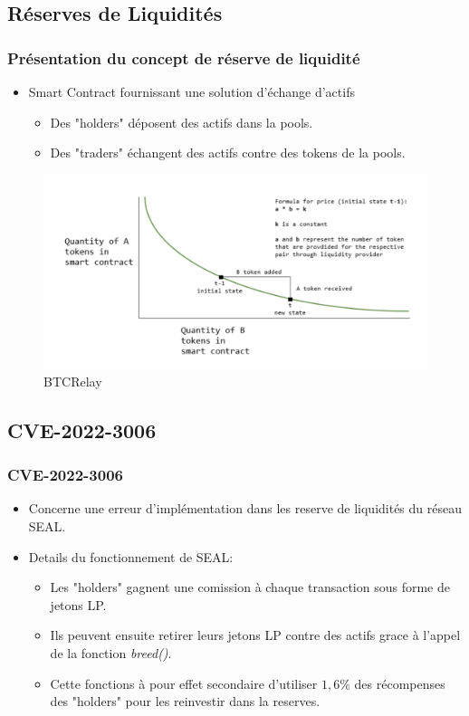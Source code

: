 \subsection{Réserves de Liquidités}

\begin{frame}
    \frametitle{Présentation du concept de réserve de liquidité}
    \begin{itemize}
        \item Smart Contract fournissant une solution d'échange d'actifs
        \begin{itemize}
            \item Des "holders" déposent des actifs dans la pools.
            \item Des "traders" échangent des actifs contre des tokens de la pools.
        \end{itemize}
    \end{itemize}    
    \begin{figure}
        \centering
        \includegraphics[scale = 0.22]{decentralisation/reserve_liquidite.png}
        \caption{BTCRelay}
    \end{figure}
\end{frame}

\subsection{CVE-2022-3006}
\begin{frame}
    \frametitle{CVE-2022-3006}
    \begin{itemize}
        \item Concerne une erreur d'implémentation dans les reserve de liquidités du réseau SEAL.
        \item Details du fonctionnement de SEAL:
        \begin{itemize}
            \item Les "holders" gagnent une comission à chaque transaction sous forme de jetons LP.
            \item Ils peuvent ensuite retirer leurs jetons LP contre des actifs grace à l'appel de la fonction \textit{breed()}.
            \item Cette fonctions à pour effet secondaire d'utiliser $1,6\%$ des récompenses des "holders" pour les reinvestir dans la reserves.
        \end{itemize}
    \end{itemize}   
\end{frame}

